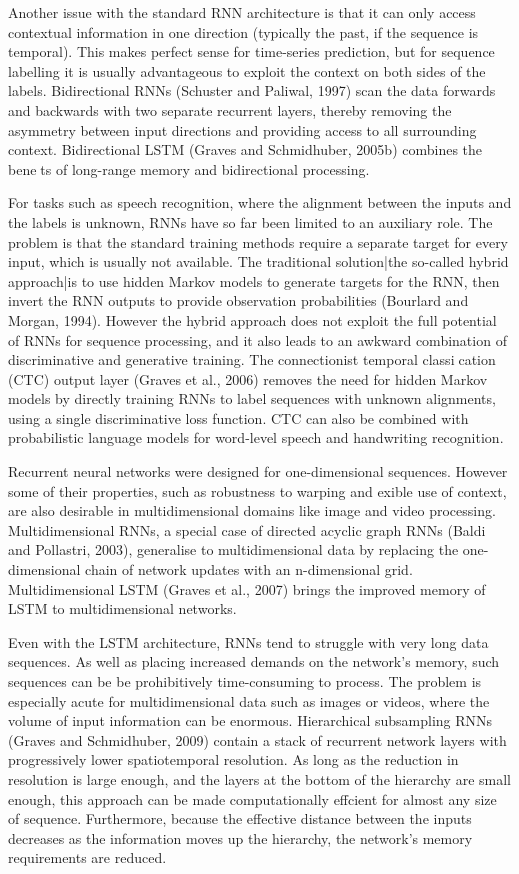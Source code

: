 Another issue with the standard RNN architecture is that it can only access contextual information in one direction (typically the past, if the sequence is temporal). This makes perfect sense for time-series prediction, but for sequence labelling it is usually advantageous to exploit the context on both sides of the labels. Bidirectional RNNs (Schuster and Paliwal, 1997) scan the data forwards and backwards with two separate recurrent layers, thereby removing the asymmetry between input directions and providing access to all surrounding context. Bidirectional LSTM (Graves and Schmidhuber, 2005b) combines the benets of long-range memory and bidirectional processing.

For tasks such as speech recognition, where the alignment between the inputs and the labels is unknown, RNNs have so far been limited to an auxiliary role. The problem is that the standard training methods require a separate target for every input, which is usually not available. The traditional solution|the so-called hybrid approach|is to use hidden Markov models to generate targets for the RNN, then invert the RNN outputs to provide observation probabilities (Bourlard and Morgan, 1994). However the hybrid approach does not exploit the full potential of RNNs for sequence processing, and it also leads to an awkward combination of discriminative and generative training. The connectionist temporal classication (CTC) output layer (Graves et al., 2006) removes the need for hidden Markov models by directly training RNNs to label sequences with unknown alignments, using a single discriminative loss function. CTC can also be combined with probabilistic language models for word-level speech and handwriting recognition.

Recurrent neural networks were designed for one-dimensional sequences. However some of their properties, such as robustness to warping and exible use of context, are also desirable in multidimensional domains like image and video processing. Multidimensional RNNs, a special case of directed acyclic graph RNNs (Baldi and Pollastri, 2003), generalise to multidimensional data by replacing the one-dimensional chain of network updates with an n-dimensional grid. Multidimensional LSTM (Graves et al., 2007) brings the improved memory of LSTM to multidimensional networks.

Even with the LSTM architecture, RNNs tend to struggle with very long data sequences. As well as placing increased demands on the network's memory, such sequences can be be prohibitively time-consuming to process. The problem is especially acute for multidimensional data such as images or videos, where the volume of input information can be enormous. Hierarchical subsampling RNNs (Graves and Schmidhuber, 2009) contain a stack of recurrent network layers with progressively lower spatiotemporal resolution. As long as the reduction in resolution is large enough, and the layers at the bottom of the hierarchy are small enough, this approach can be made computationally effcient for almost any size of sequence. Furthermore, because the effective distance between the inputs decreases as the information moves up the hierarchy, the network's memory requirements are reduced.

